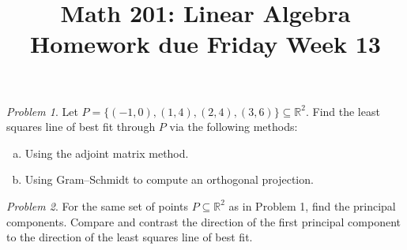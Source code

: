\documentclass[11pt,twoside]{amsart}
\title{Math 201: Linear Algebra\\ Homework due Friday Week 13}
\theoremstyle{plain}
\theoremstyle{remark}
\newtheorem{prob}{Problem}
\theoremstyle{definition}
\theoremstyle{definition}
\newcommand{\RR}{\mathbb{R}}
\begin{document}
\maketitle

\begin{prob}
Let $P = \{(-1,0),(1,4),(2,4),(3,6)\}\subseteq \RR^2$. Find the least squares line of best fit through $P$ via the following methods:
\begin{enumerate}[(a)]
\item Using the adjoint matrix method.
\item Using Gram--Schmidt to compute an orthogonal projection.
\end{enumerate}
\end{prob}

\begin{prob}
For the same set of points $P\subseteq \RR^2$ as in Problem 1, find the principal components. Compare and contrast the direction of the first principal component to the direction of the least squares line of best fit.
\end{prob}
\end{document}
